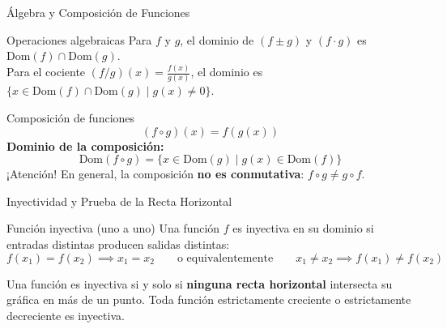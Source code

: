 \documentclass[aspectratio=169]{beamer}
\begin{document}
\begin{frame}{Álgebra y Composición de Funciones}
  \begin{block}{Operaciones algebraicas}
    Para $f$ y $g$, el dominio de $(f \pm g)$ y $(f \cdot g)$ es $\text{Dom}(f) \cap \text{Dom}(g)$. \\
    Para el cociente $(f / g)(x) = \frac{f(x)}{g(x)}$, el dominio es $\{x \in \text{Dom}(f) \cap \text{Dom}(g) \mid g(x) \neq 0\}$.
  \end{block}

  \vspace{4pt}
  \begin{block}{Composición de funciones}
    $$(f \circ g)(x) = f(g(x))$$
    \textbf{Dominio de la composición:}
    $$\boxed{\text{Dom}(f \circ g) = \{x \in \text{Dom}(g) \mid g(x) \in \text{Dom}(f)\}}$$
    \alert{¡Atención!} En general, la composición \textbf{no es conmutativa}: $f \circ g \neq g \circ f$.
  \end{block}
\end{frame}

\begin{frame}{Inyectividad y Prueba de la Recta Horizontal}
  \begin{block}{Función inyectiva (uno a uno)}
    Una función $f$ es inyectiva en su dominio si entradas distintas producen salidas distintas:
    $$f(x_1) = f(x_2) \implies x_1 = x_2 \qquad \text{o equivalentemente} \qquad x_1 \neq x_2 \implies f(x_1) \neq f(x_2)$$
  \end{block}

  \vspace{4pt}
  \begin{mwextra}
    Una función es inyectiva si y solo si \textbf{ninguna recta horizontal} intersecta su gráfica en más de un punto.
    Toda función estrictamente creciente o estrictamente decreciente es inyectiva.
  \end{mwextra}
\end{frame}
\end{document}
